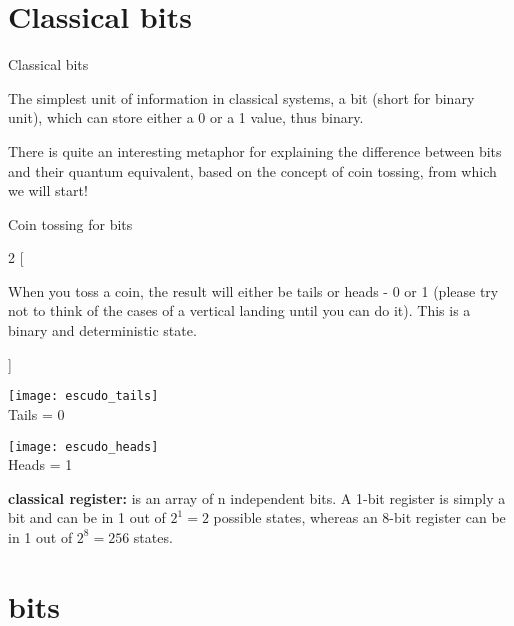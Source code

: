 \documentclass[aspectratio=43]{beamer}
\begin{document}
\section{Classical bits}
\begin{frame}{Classical bits}
    \begin{card}
    The simplest unit of information in classical systems, a bit (short for binary unit), which can store either a 0 or a 1 value, thus binary. 
    \end{card}
    \begin{card}
    There is quite an interesting metaphor for explaining the difference between bits and their quantum equivalent, based on the concept of coin tossing, from which we will start!
    \end{card}
\pagenumber
\end{frame}

\begin{frame}{Coin tossing for bits}
	\begin{multicols}{2}
		[
		\begin{cardTiny}
			When you toss a coin, the result will either be tails or heads - 0 or 1 (please try not to think of the cases of a vertical landing until you can do it). This is a binary and deterministic state.
		\end{cardTiny}
		]
        \begin{center}
	        \texttt{[image: escudo\_tails]}
	        \\Tails = 0
    	\end{center}
        \begin{center}
	        \texttt{[image: escudo\_heads]}
	        \\Heads = 1
    	\end{center}
	\end{multicols}
	\begin{cardTiny}
		\textbf{classical register:} is an array of n independent bits. A 1-bit register is simply a bit and can be in 1 out of $2^1 = 2$ possible states, whereas an 8-bit register can be in 1 out of $2^8 = 256$ states.
	\end{cardTiny}
\pagenumber
\end{frame}

\section{\q bits}
\end{document}
